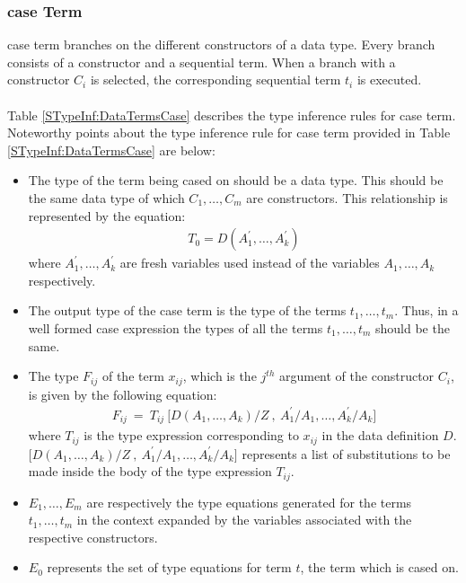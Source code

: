 \documentclass[11pt]{article}
\begin{document}
\subsubsection {case Term} 
{\sf case} term branches on the different constructors of a data type. Every branch consists of a constructor and a sequential term. When a branch with a constructor ${C_i}$ is selected, the corresponding sequential term ${t_i}$ is executed.
~~\\~~\\ 
Table \ref {STypeInf:DataTermsCase} describes the type inference rules for {\sf case} term. Noteworthy points about the type inference rule for {\sf case} term provided in Table \ref {STypeInf:DataTermsCase} are below:
\begin{itemize}
  \item The type of the term being cased on should be a data type. This should be the same data type of which ${C_1,\ldots,C_m}$ are constructors. This relationship is represented by the equation:
  \begin{align*}
   T_0 = D(A_1^\prime,\ldots,A_k^\prime)
  \end{align*}
   where ${A_1^{\prime},\ldots,A_k^{\prime}}$ are fresh variables used instead of the variables ${A_1,\ldots,A_k}$ respectively.

  \item The output type of the {\sf case} term is the type of the terms ${t_1,\ldots,t_m}$. Thus, in a well formed case expression the types of all the terms ${t_1,\ldots,t_m}$ should be the same.
  \item The type ${F_{ij}}$ of the term ${x_{ij}}$, which is the ${j^{th}}$ argument of the constructor ${C_i}$, is given by the following equation:
  \begin{align*}
  F_{ij}~=~T_{ij}~\Big[D(A_1,\ldots,A_k)/Z~,~A_1^{\prime}/A_1,\ldots,A_k^{\prime}/A_k \Big]
  \end{align*}
  where ${T_{ij}}$ is the type expression corresponding to ${x_{ij}}$ in the data definition ${D}$.\\ 
  $\Big[D(A_1,\ldots,A_k)/Z~,~A_1^{\prime}/A_1,\ldots,A_k^{\prime}/A_k \Big]$ represents a list of substitutions to be made inside the body of the type expression $T_{ij}$.

  \item ${E_1,\ldots,E_m}$ are respectively the type equations generated for the terms ${t_1,\ldots,t_m}$ in the context expanded by the variables associated with the respective constructors. 
  \item ${E_0}$ represents the set of type equations for term ${t}$, the term which is cased on.
\end{itemize}
\end{document}
